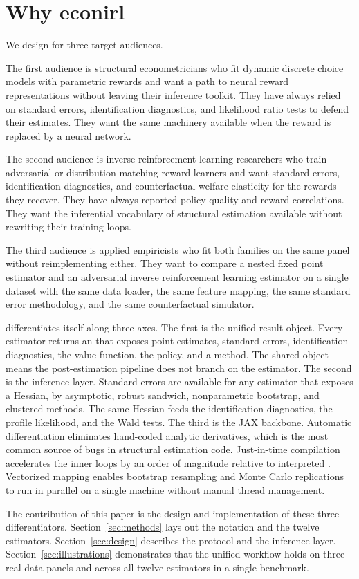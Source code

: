\section{Why econirl} \label{sec:why}

We design  for three target audiences.

The first audience is structural econometricians who fit dynamic discrete choice models with parametric rewards and want a path to neural reward representations without leaving their inference toolkit. They have always relied on standard errors, identification diagnostics, and likelihood ratio tests to defend their estimates. They want the same machinery available when the reward is replaced by a neural network.

The second audience is inverse reinforcement learning researchers who train adversarial or distribution-matching reward learners and want standard errors, identification diagnostics, and counterfactual welfare elasticity for the rewards they recover. They have always reported policy quality and reward correlations. They want the inferential vocabulary of structural estimation available without rewriting their training loops.

The third audience is applied empiricists who fit both families on the same panel without reimplementing either. They want to compare a nested fixed point estimator and an adversarial inverse reinforcement learning estimator on a single dataset with the same data loader, the same feature mapping, the same standard error methodology, and the same counterfactual simulator.

 differentiates itself along three axes. The first is the unified result object. Every estimator returns an  that exposes point estimates, standard errors, identification diagnostics, the value function, the policy, and a  method. The shared object means the post-estimation pipeline does not branch on the estimator. The second is the inference layer. Standard errors are available for any estimator that exposes a Hessian, by asymptotic, robust sandwich, nonparametric bootstrap, and clustered methods. The same Hessian feeds the identification diagnostics, the profile likelihood, and the Wald tests. The third is the JAX backbone. Automatic differentiation eliminates hand-coded analytic derivatives, which is the most common source of bugs in structural estimation code. Just-in-time compilation accelerates the inner loops by an order of magnitude relative to interpreted . Vectorized mapping enables bootstrap resampling and Monte Carlo replications to run in parallel on a single machine without manual thread management.

The contribution of this paper is the design and implementation of these three differentiators. Section~\ref{sec:methods} lays out the notation and the twelve estimators. Section~\ref{sec:design} describes the  protocol and the inference layer. Section~\ref{sec:illustrations} demonstrates that the unified workflow holds on three real-data panels and across all twelve estimators in a single benchmark.
